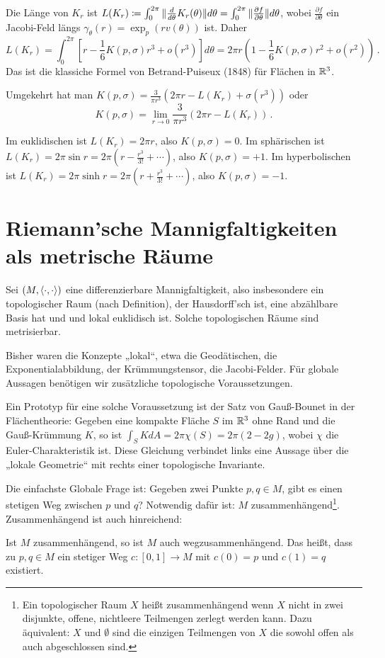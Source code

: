 \documentclass[a4paper,twoside,DIV15,BCOR12mm]{scrbook}
\begin{document}
\begin{beispiel}
Die Länge von $K_r$ ist $L(K_r)\da \int_{0}^{2\pi} \|\frac d{d\theta} K_r(\theta) \| d\theta = \int_0^{2\pi} \|\frac{\partial f}{\partial \theta}\|d\theta $, wobei $\frac{\partial f}{\partial \theta}$ ein Jacobi-Feld längs $\gamma_\theta(r) = \exp_p(rv(\theta))$ ist. Daher \[ L(K_r) = \int_0^{2\pi} [r - \frac 1 6 K(p,\sigma) r^3 + o(r^3)] d\theta = 2\pi r(1 - \frac 1 6 K(p,\sigma)r^2 + o(r^2))\,.\] Das ist die klassiche Formel von Betrand-Puiseux (1848) für Flächen in $\mathbb{R}^3$.

Umgekehrt hat man $K(p,\sigma) = \frac3{\pi r^3} (2\pi r - L(K_r) + \sigma(r^3))$ oder \[ K(p,\sigma) = \lim_{r\to0} \frac 3{\pi r^3}(2\pi r - L(K_r))\,.\]

Im euklidischen ist $L(K_r) = 2\pi r$, also $K(p,\sigma) = 0$. Im sphärischen ist $L(K_r) = 2\pi \sin r = 2\pi(r - \frac{r^3}{3!} + \cdots )$, also $K(p,\sigma) = +1$. Im hyperbolischen ist $L(K_r) = 2\pi \sinh r = 2\pi (r + \frac{r^3}{3!} +\cdots)$, also $K(p,\sigma) = -1$.

\end{beispiel}



\chapter{Riemann’sche Mannigfaltigkeiten als metrische Räume}

Sei $(M,\langle\cdot,\cdot\rangle)$ eine differenzierbare Mannigfaltigkeit, also insbesondere ein topologischer Raum (nach Definition), der Hausdorff’sch ist, eine abzählbare Basis hat und und lokal euklidisch ist. Solche topologischen Räume sind metrisierbar.

Bisher waren die Konzepte „lokal“, etwa die Geodätischen, die Exponentialabbildung, der Krümmungstensor, die Jacobi-Felder. Für globale Aussagen benötigen wir zusätzliche topologische Voraussetzungen.

Ein Prototyp für eine solche Voraussetzung ist der Satz von Gauß-Bounet in der Flächentheorie: Gegeben eine kompakte Fläche $S$ im $\mathbb{R}^3$ ohne Rand und die Gauß-Krümmung $K$, so ist $\int_S KdA = 2\pi \chi(S) = 2\pi (2 - 2g)$, wobei $\chi$ die Euler-Charakteristik ist. Diese Gleichung verbindet links eine Aussage über die „lokale Geometrie“ mit rechts einer topologische Invariante.

Die einfachste Globale Frage ist: Gegeben zwei Punkte $p,q\in M$, gibt es einen stetigen Weg zwischen $p$ und $q$? Notwendig dafür ist: $M$ zusammenhängend\footnote{Ein topologischer Raum $X$ heißt zusammenhängend wenn $X$ nicht in zwei disjunkte, offene, nichtleere Teilmengen zerlegt werden kann. Dazu äquivalent: $X$ und $\emptyset$ sind die einzigen Teilmengen von $X$ die sowohl offen als auch abgeschlossen sind.}. Zusammenhängend ist auch hinreichend:
\begin{lemma}
Ist $M$ zusammenhängend, so ist $M$ auch wegzusammenhängend. Das heißt, dass zu $p,q\in M$ ein stetiger Weg $c:[0,1]\to M$ mit $c(0)=p$ und $c(1)=q$ existiert.
\end{lemma}
\end{document}
